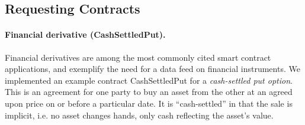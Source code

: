 
\subsection{Requesting Contracts}
\label{sec:applications}



\paragraph{Financial derivative ({\sf CashSettledPut}).}
Financial derivatives are among the most commonly cited smart contract
applications,
and exemplify the need for a data feed on financial instruments.
We implemented an example contract {\sf CashSettledPut} for a {\em cash-settled put option}.
This is an agreement for one party to buy an asset from the other at an agreed upon price on or before a particular date.
It is ``cash-settled'' in that the sale is implicit, i.e. no asset changes hands, only cash reflecting the asset's value.
%
\iffalse
